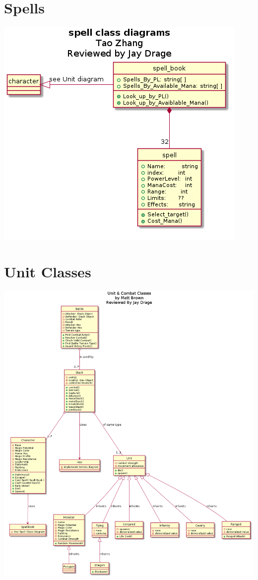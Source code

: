 \documentclass{article}
\begin{document}

\section{Spells}
\includegraphics[width=\textwidth]{pngs/spell.png}

\section{Unit Classes}
\includegraphics[width=\textwidth]{pngs/UnitClasses.png}



\end{document}
